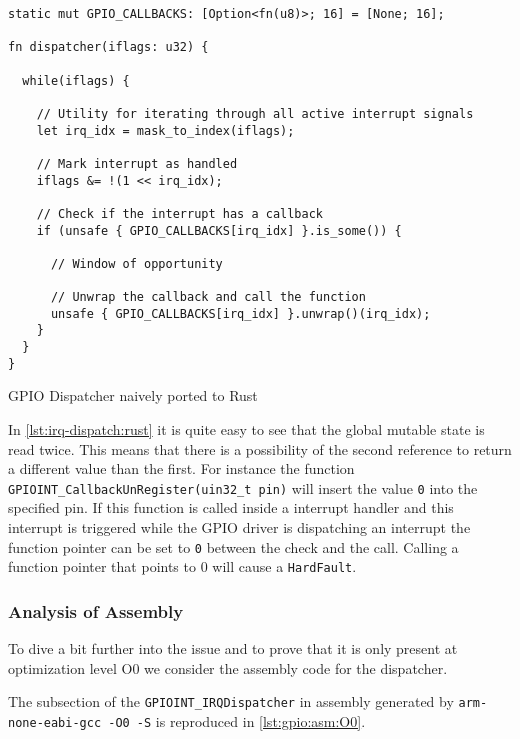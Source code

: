 \begin{listing}
  \begin{verbatim}
static mut GPIO_CALLBACKS: [Option<fn(u8)>; 16] = [None; 16];

fn dispatcher(iflags: u32) {

  while(iflags) {

    // Utility for iterating through all active interrupt signals
    let irq_idx = mask_to_index(iflags);

    // Mark interrupt as handled
    iflags &= !(1 << irq_idx);

    // Check if the interrupt has a callback
    if (unsafe { GPIO_CALLBACKS[irq_idx] }.is_some()) {

      // Window of opportunity

      // Unwrap the callback and call the function
      unsafe { GPIO_CALLBACKS[irq_idx] }.unwrap()(irq_idx);
    }
  }
}
  \end{verbatim}
  \caption{GPIO Dispatcher naively ported to Rust}
  \label{lst:irq-dispatch:rust}
\end{listing}

In \autoref{lst:irq-dispatch:rust} it is quite easy to see that the global mutable state is read twice.
This means that there is a possibility of the second reference to return a different value than the first.
For instance the function \texttt{GPIOINT\_CallbackUnRegister(uin32\_t pin)} will insert the value \texttt{0} into the specified pin.
If this function is called inside a interrupt handler and this interrupt is triggered while the GPIO driver is dispatching an interrupt the function pointer can be set to \texttt{0} between the check and the call.
Calling a function pointer that points to 0 will cause a \texttt{HardFault}.

\subsubsection{Analysis of Assembly}
To dive a bit further into the issue and to prove that it is only present at optimization level O0 we consider the assembly code for the dispatcher.

The subsection of the \texttt{GPIOINT\_IRQDispatcher} in assembly generated by \texttt{arm-none-eabi-gcc -O0 -S} is reproduced in \autoref{lst:gpio:asm:O0}.

